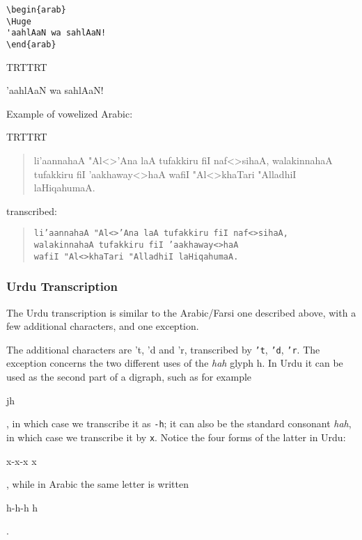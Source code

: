 \documentclass[a4paper,11pt]{article}
\def\shortarab#1{{\pushocplist\ArabicOCP\fontfamily{omarb}\selectfont#1\popocplist}}
\begin{document}
\begin{verbatim}
\begin{arab}
\Huge
'aahlAaN wa sahlAaN!
\end{arab}
\end{verbatim}

{\pardir TRT\textdir TRT
\begin{center}
\begin{arab}
\Huge
'aahlAaN wa sahlAaN!
\end{arab}
\end{center}
}

\noindent
Example of vowelized Arabic:\\[8pt]

{\pardir TRT\textdir TRT
\begin{quote}
\pushocplist\ArabicOCP{}\selectfont\LARGE li'aannahaA
"Al<>'Ana laA tufakkiru fiI naf<>sihaA, walakinnahaA tufakkiru fiI
'aakhaway<>haA wafiI "Al<>khaTari "AlladhiI laHiqahumaA.  \popocplist
\end{quote}
}

\noindent transcribed: 

\begin{quote}
\texttt{li'aannahaA "Al<>'Ana laA tufakkiru fiI naf<>sihaA,\\
walakinnahaA tufakkiru fiI 'aakhaway<>haA\\
wafiI "Al<>khaTari "AlladhiI laHiqahumaA.}
\end{quote}

\subsubsection{Urdu Transcription}

The Urdu transcription is similar to the Arabic/Farsi one described
above, with a few additional characters, and one exception.

The additional characters are \shortarab{'t}, \shortarab{'d} and
\shortarab{'r}, transcribed by \texttt{'t}, \texttt{'d},
\texttt{'r}. The exception concerns the two different uses of the
\emph{hah} glyph \shortarab{h}. In Urdu it can be used as the second
part of a digraph, such as for example
\begin{smallurdu}jh\end{smallurdu}, in which case we transcribe it as
\texttt{-h}; it can also be the standard consonant \emph{hah}, in
which case we transcribe it by \texttt{x}.  Notice the four forms of
the latter in Urdu: \begin{smallurdu}x-x-x x\end{smallurdu}, while in
Arabic the same letter is written \begin{smallarab}h-h-h
h\end{smallarab}.
\end{document}
